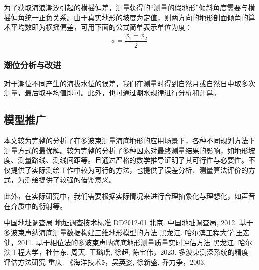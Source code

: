\documentclass[withoutpreface,bwprint]{cumcmthesis} %
\begin{document}
为了获取海浪潮汐引起的横摇偏差，测量获得的“测量的假地形”倾斜角度需要与横摇偏角统一正负关系。由于真实地形的坡度为定值，则两方向的地形剖面倾角的算术平均数即为横摇偏差，可用下面的公式简单表示单位为度：
\begin{equation}
\phi=\frac{\phi_1+\phi_2}{2}
\end{equation}
\subsubsection{潮位分析与改进}
对于潮位不同产生的海拔水位的误差，我们在测量时得到自然月或自然日中取多次测量，最后取平均值即可。此外，也可通过潮水规律进行分析和计算。
\subsection{模型推广}
本文较为完整的分析了在多波束测量海底地形的应用场景下，各种不同规划方法下测量方式的最优解。较为完整的分析了多种因素对最终测量结果的影响，如地形坡度、测量路线、测线间距等。且通过严格的数学推导证明了其可行性与必要性。不仅提供了实际测绘工作中较为可行的方法，也提供了误差分析、测量算法评价的方式，为测绘提供了较强的借鉴意义。

此外，在实际研究中，我们需要根据实际情况来进行合理抽象化与理想化，如声音在介质中的衍射等。



\begin{thebibliography}{9}%
    中国地址调查局 地址调查技术标准 DD2012-01
    \newblock 北京\allowbreak[S].
    \newblock 中国地址调查局, 2012.
	基于多波束声纳海底测量数据构建三维地形模型的方法
    \newblock 黑龙江\allowbreak[P].
    \newblock 哈尔滨工程大学,王宏健，2011.
	基于相位法的多波束声呐海底地形测量质量实时评估方法
    \newblock 黑龙江\allowbreak[M].
    \newblock 哈尔滨工程大学，杜伟东, 周天, 王璐瑶, 徐超, 陈宝伟，2023.
	多波束测深系统的精度评估方法研究
    \newblock 重庆\allowbreak[M].
    \newblock 《海洋技术》，吴英姿, 徐新盛, 乔力争，2003.

\end{thebibliography}
\end{document}
